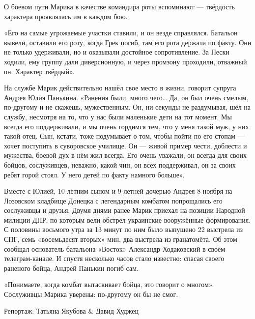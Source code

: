 О боевом пути Марика в качестве командира роты вспоминают — твёрдость характера
проявлялась им в каждом бою.

«Его на самые угрожаемые участки ставили, и он везде справлялся. Батальон
вывели, оставили его роту, когда Грек погиб, там его рота держала по факту. Они
не только удерживали, но и оказывали достойное сопротивление. За Пески ходили,
ему группу дали диверсионную, и через промзону проходили, отважный он. Характер
твёрдый».

На службе Марик действительно нашёл свое место в жизни, говорит супруга Андрея
Юлия Панькина.  «Ранения были, много чего… Да, он был очень смелым, по-другому
и не скажешь, мужественным. Он, ни секунды не раздумывая, шёл на службу,
несмотря на то, что у нас были маленькие дети на тот момент. Мы всегда его
поддерживали, и мы очень гордимся тем, что у меня такой муж, у них такой отец.
Сын, кстати, тоже подумывает о том, чтобы пойти по его стопам — хочет поступить
в суворовское училище. Он — живой пример чести, доблести и мужества, боевой дух
в нём жил всегда. Его очень уважали, он всегда для своих бойцов, сослуживцев,
неважно, какой чин, он всех поддерживал, он за своих ребят горой стоял. У него
детей по факту намного больше».

Вместе с Юлией, 10-летним сыном и 9-летней дочерью Андрея 8 ноября на Лозовском
кладбище Донецка с легендарным комбатом попрощались его сослуживцы и друзья.
Двумя днями ранее Марик приехал на позиции Народной милиции ДНР, по которым
вели обстрел украинские вооружённые формирования. С половины восьмого утра за
13 минут по ним было выпущено 22 выстрела из СПГ, семь «восемьдесят вторых»
мин, два выстрела из гранатомёта. Об этом сообщал основатель батальона «Восток»
Александр Ходаковский в своём телеграм-канале. И спустя несколько часов стало
известно: спасая своего раненого бойца, Андрей Панькин погиб сам.

«Понимаете, когда комбат вытаскивает бойца, это говорит о многом». Сослуживцы
Марика уверены: по-другому он бы не смог.

Репортаж: Татьяна Якубова \& Давид Худжец
